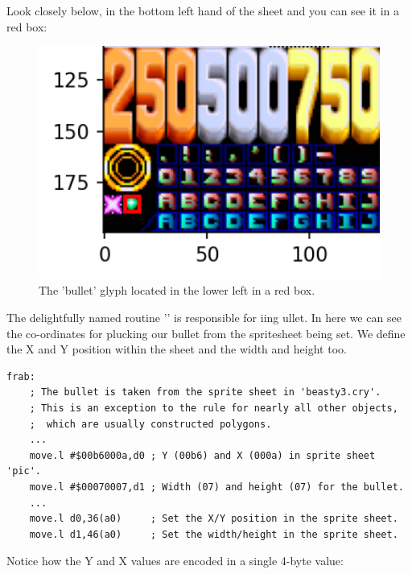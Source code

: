 Look closely below, in the bottom left hand of the sheet and you can see it in a red box:
\begin{figure}[H]
    \centering
    \begin{adjustbox}{width=9.5cm,center}
      \includegraphics[width=12cm]{src/bullet/plot_detail.png}%
    \end{adjustbox}
\caption{The 'bullet' glyph located in the lower left in a red box.}
\end{figure}


The delightfully named routine '' is responsible for iing ullet.
In here we can see the co-ordinates for plucking our bullet from the spritesheet being set. We define the
X and Y position within the sheet and the width and height too.

\begin{lstlisting}
frab:
    ; The bullet is taken from the sprite sheet in 'beasty3.cry'.
    ; This is an exception to the rule for nearly all other objects,
    ;  which are usually constructed polygons.
    ...
    move.l #$00b6000a,d0 ; Y (00b6) and X (000a) in sprite sheet 'pic'.
    move.l #$00070007,d1 ; Width (07) and height (07) for the bullet.
    ...
    move.l d0,36(a0)     ; Set the X/Y position in the sprite sheet.
    move.l d1,46(a0)     ; Set the width/height in the sprite sheet.
\end{lstlisting}

Notice how the Y and X values are encoded in a single 4-byte value:

